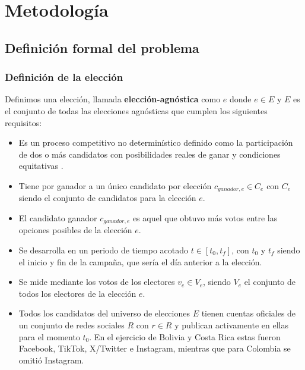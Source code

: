 

\chapter{Metodología}\label{ch:metodologia}

\section{Definición formal del problema}

\subsection{Definición de la elección}

Definimos una elección, llamada \textbf{elección-agnóstica} como $e$ donde $e \in E$ y $E$ es el conjunto de todas las elecciones agnósticas que cumplen los siguientes requisitos:

\begin{itemize}
    \item Es un proceso competitivo no determinístico definido como la participación de dos o más candidatos con posibilidades reales de ganar y condiciones equitativas \parencite{kayser2015}.
    \item Tiene por ganador a un único candidato por elección $c_{ganador,e} \in C_e$ con $C_e$ siendo el conjunto de candidatos para la elección $e$.
    \item El candidato ganador $c_{ganador,e}$ es aquel que obtuvo más votos entre las opciones posibles de la elección $e$.
    \item Se desarrolla en un periodo de tiempo acotado $t \in [t_0, t_f]$, con $t_0$ y $t_f$ siendo el inicio y fin de la campaña, que sería el día anterior a la elección.
    \item Se mide mediante los votos de los electores $v_e \in V_e$, siendo $V_e$ el conjunto de todos los electores de la elección $e$.
    \item Todos los candidatos del universo de elecciones $E$ tienen cuentas oficiales de un conjunto de redes sociales $R$ con $r \in R$ y publican activamente en ellas para el momento $t_0$. En el ejercicio de Bolivia y Costa Rica estas fueron Facebook, TikTok, X/Twitter e Instagram, mientras que para Colombia se omitió Instagram.
\end{itemize}

